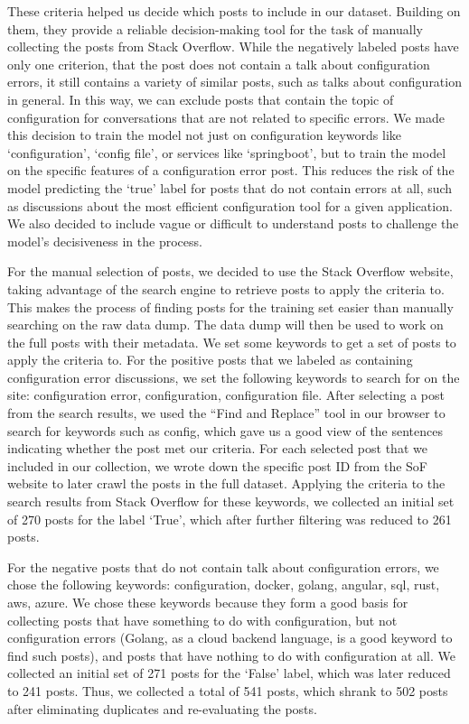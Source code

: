 \documentclass[english,bachelor]{swsLeipzig}
\begin{document}
These criteria helped us decide which posts to include in our dataset. Building on them, they provide a reliable 
decision-making tool for the task of manually collecting the posts from Stack Overflow. While the negatively labeled posts have only one criterion, that the post does not contain a talk about configuration errors, it still contains a variety of similar posts, such as talks about configuration in general. In this way, we can exclude posts that contain the topic of configuration for conversations that are not related to specific errors. We made this decision to train the model not just on configuration keywords like `configuration', `config file', or services like `springboot', but to train the model on the specific features of a configuration error post. This reduces the risk of the model predicting the `true' label for posts that do not contain errors at all, such as discussions about the most efficient configuration tool for a given application. We also decided to include vague or difficult to understand posts to challenge the model's decisiveness in the process.

For the manual selection of posts, we decided to use the Stack Overflow website, taking advantage of the search engine 
to retrieve posts to apply the criteria to. This makes the process of finding posts for the training set easier than manually searching on the raw data dump. The data dump will then be used to work on the full posts with their metadata. We set some keywords to get a set of posts to apply the criteria to. For the positive posts that we labeled as containing configuration error discussions, we set the following keywords to search for on the site: configuration error, configuration, configuration file. After selecting a post from the search results, we used the ``Find and Replace'' tool in our browser to search for keywords such as config, which gave us a good view of the sentences indicating whether the post met our criteria. For each selected post that we included in our collection, we wrote down the specific post ID from the SoF website to later crawl the posts in the full dataset. Applying the criteria to the search results from Stack Overflow for these keywords, we collected an initial set of 270 posts for the label `True', which after further filtering was reduced to 261 posts.

For the negative posts that do not contain talk about configuration errors, we chose the following keywords: 
configuration, docker, golang, angular, sql, rust, aws, azure. We chose these keywords because they form a good basis for collecting posts that have something to do with configuration, but not configuration errors (Golang, as a cloud backend language, is a good keyword to find such posts), and posts that have nothing to do with configuration at all. We collected an initial set of 271 posts for the `False' label, which was later reduced to 241 posts. Thus, we collected a total of 541 posts, which shrank to 502 posts after eliminating duplicates and re-evaluating the posts.
\end{document}
